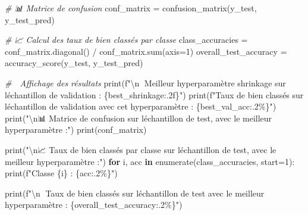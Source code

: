\documentclass[
]{article}
\newenvironment{Shaded}{}{}
\newcommand{\BuiltInTok}[1]{\textcolor[rgb]{0.00,0.50,0.00}{#1}}
\newcommand{\CharTok}[1]{\textcolor[rgb]{0.25,0.44,0.63}{#1}}
\newcommand{\CommentTok}[1]{\textcolor[rgb]{0.38,0.63,0.69}{\textit{#1}}}
\newcommand{\ControlFlowTok}[1]{\textcolor[rgb]{0.00,0.44,0.13}{\textbf{#1}}}
\newcommand{\DecValTok}[1]{\textcolor[rgb]{0.25,0.63,0.44}{#1}}
\newcommand{\KeywordTok}[1]{\textcolor[rgb]{0.00,0.44,0.13}{\textbf{#1}}}
\newcommand{\NormalTok}[1]{#1}
\newcommand{\OperatorTok}[1]{\textcolor[rgb]{0.40,0.40,0.40}{#1}}
\newcommand{\SpecialCharTok}[1]{\textcolor[rgb]{0.25,0.44,0.63}{#1}}
\newcommand{\SpecialStringTok}[1]{\textcolor[rgb]{0.73,0.40,0.53}{#1}}
\newcommand{\StringTok}[1]{\textcolor[rgb]{0.25,0.44,0.63}{#1}}
\begin{document}
\begin{Shaded}
\begin{Highlighting}[]
\CommentTok{\# 📊 Matrice de confusion}
\NormalTok{conf\_matrix }\OperatorTok{=}\NormalTok{ confusion\_matrix(y\_test, y\_test\_pred)}

\CommentTok{\# 📈 Calcul des taux de bien classés par classe}
\NormalTok{class\_accuracies }\OperatorTok{=}\NormalTok{ conf\_matrix.diagonal() }\OperatorTok{/}\NormalTok{ conf\_matrix.}\BuiltInTok{sum}\NormalTok{(axis}\OperatorTok{=}\DecValTok{1}\NormalTok{)}
\NormalTok{overall\_test\_accuracy }\OperatorTok{=}\NormalTok{ accuracy\_score(y\_test, y\_test\_pred)}

\CommentTok{\# 📝 Affichage des résultats}
\BuiltInTok{print}\NormalTok{(}\SpecialStringTok{f"}\CharTok{\textbackslash{}n}\SpecialStringTok{🔹 Meilleur hyperparamètre shrinkage sur l\textquotesingle{}échantillon de validation : }\SpecialCharTok{\{}\NormalTok{best\_shrinkage}\SpecialCharTok{:.2f\}}\SpecialStringTok{"}\NormalTok{)}
\BuiltInTok{print}\NormalTok{(}\SpecialStringTok{f"Taux de bien classés sur l\textquotesingle{}échantillon de validation avec cet hyperparamètre : }\SpecialCharTok{\{}\NormalTok{best\_val\_acc}\SpecialCharTok{:.2\%\}}\SpecialStringTok{"}\NormalTok{)}
\BuiltInTok{print}\NormalTok{(}\StringTok{"}\CharTok{\textbackslash{}n}\StringTok{📊 Matrice de confusion sur l\textquotesingle{}échantillon de test, avec le meilleur hyperparamètre :"}\NormalTok{)}
\BuiltInTok{print}\NormalTok{(conf\_matrix)}

\BuiltInTok{print}\NormalTok{(}\StringTok{"}\CharTok{\textbackslash{}n}\StringTok{📈 Taux de bien classés par classe sur l\textquotesingle{}échantillon de test, avec le meilleur hyperparamètre :"}\NormalTok{)}
\ControlFlowTok{for}\NormalTok{ i, acc }\KeywordTok{in} \BuiltInTok{enumerate}\NormalTok{(class\_accuracies, start}\OperatorTok{=}\DecValTok{1}\NormalTok{):}
    \BuiltInTok{print}\NormalTok{(}\SpecialStringTok{f"Classe }\SpecialCharTok{\{}\NormalTok{i}\SpecialCharTok{\}}\SpecialStringTok{ : }\SpecialCharTok{\{}\NormalTok{acc}\SpecialCharTok{:.2\%\}}\SpecialStringTok{"}\NormalTok{)}

\BuiltInTok{print}\NormalTok{(}\SpecialStringTok{f"}\CharTok{\textbackslash{}n}\SpecialStringTok{🔹 Taux de bien classés sur l\textquotesingle{}échantillon de test avec le meilleur hyperparamètre : }\SpecialCharTok{\{}\NormalTok{overall\_test\_accuracy}\SpecialCharTok{:.2\%\}}\SpecialStringTok{"}\NormalTok{)}
\end{Highlighting}
\end{Shaded}
\end{document}
